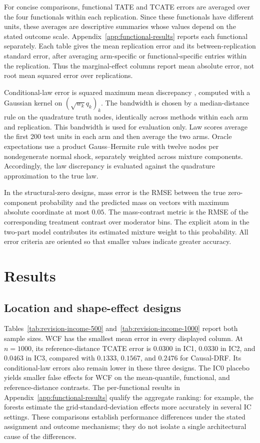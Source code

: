 \documentclass[11pt]{article}
\begin{document}
For concise comparisons, functional TATE and TCATE errors are averaged over the four functionals within each replication. Since these functionals have different units, these averages are descriptive summaries whose values depend on the stated outcome scale. Appendix~\ref{app:functional-results} reports each functional separately. Each table gives the mean replication error and its between-replication standard error, after averaging arm-specific or functional-specific entries within the replication. Thus the marginal-effect columns report mean absolute error, not root mean squared error over replications.

Conditional-law error is squared maximum mean discrepancy \citep{gretton2012kernel}, computed with a Gaussian kernel on $(\sqrt{w_k}q_k)_k$. The bandwidth is chosen by a median-distance rule on the quadrature truth nodes, identically across methods within each arm and replication. This bandwidth is used for evaluation only. Law scores average the first 200 test units in each arm and then average the two arms. Oracle expectations use a product Gauss--Hermite rule with twelve nodes per nondegenerate normal shock, separately weighted across mixture components. Accordingly, the law discrepancy is evaluated against the quadrature approximation to the true law.

In the structural-zero designs, mass error is the RMSE between the true zero-component probability and the predicted mass on vectors with maximum absolute coordinate at most $0.05$. The mass-contrast metric is the RMSE of the corresponding treatment contrast over moderator bins. The explicit atom in the two-part model contributes its estimated mixture weight to this probability. All error criteria are oriented so that smaller values indicate greater accuracy.

\section{Results}\label{sec:results}

\subsection{Location and shape-effect designs}

Tables~\ref{tab:revision-income-500} and~\ref{tab:revision-income-1000} report both sample sizes. WCF has the smallest mean error in every displayed column. At $n=1000$, its reference-distance TCATE error is $0.0300$ in IC1, $0.0330$ in IC2, and $0.0463$ in IC3, compared with $0.1333$, $0.1567$, and $0.2476$ for Causal-DRF. Its conditional-law errors also remain lower in these three designs. The IC0 placebo yields smaller false effects for WCF on the mean-quantile, functional, and reference-distance contrasts. The per-functional results in Appendix~\ref{app:functional-results} qualify the aggregate ranking: for example, the forests estimate the grid-standard-deviation effects more accurately in several IC settings. These comparisons establish performance differences under the stated assignment and outcome mechanisms; they do not isolate a single architectural cause of the differences.
\end{document}
